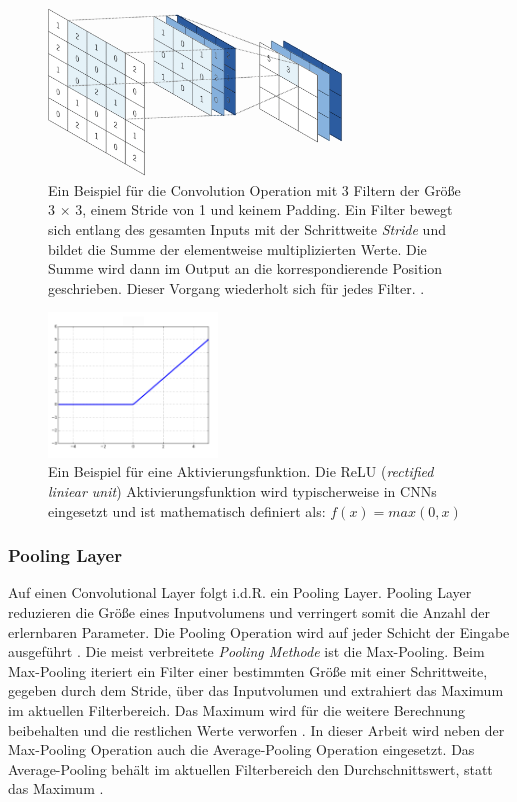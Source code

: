 \pagebreak
\vspace*{\fill}
\begin{figure}[H]
	\centering
	\includegraphics[width=0.7\textwidth]{images/convolution_layer.png}
	\caption{Ein Beispiel für die  Convolution Operation mit 3 Filtern der Größe 3 $\times$ 3, einem Stride von 1 und keinem Padding. Ein Filter bewegt sich entlang des gesamten Inputs mit der Schrittweite \textit{Stride} und bildet die Summe der elementweise multiplizierten Werte. Die Summe wird dann im Output an die korrespondierende Position geschrieben. Dieser Vorgang wiederholt sich für jedes Filter. \cite{yamashitaConvolutionalNeuralNetworks2018}. }
	\label{fig:convolution_layer}
\end{figure}

\begin{figure}[h]
	\centering
	\includegraphics[width=0.4\textwidth]{images/ReLU.png}
	\caption{Ein Beispiel für eine Aktivierungsfunktion. Die ReLU (\textit{rectified liniear unit}) Aktivierungsfunktion wird typischerweise in CNNs eingesetzt und ist mathematisch definiert als: $f(x) = max(0,x)$ \cite{Goodfellow-et-al-2016} }
	\label{fig:relu}
\end{figure}

\subsubsection{Pooling Layer}
Auf einen Convolutional Layer folgt i.d.R. ein Pooling Layer. Pooling Layer reduzieren die Größe eines Inputvolumens und verringert somit die Anzahl der erlernbaren Parameter. Die Pooling Operation wird auf jeder Schicht der Eingabe ausgeführt \cite{CS231nConvolutionalNeurala}. Die meist verbreitete \textit{Pooling Methode} ist die Max-Pooling. Beim Max-Pooling iteriert ein Filter einer bestimmten Größe mit einer Schrittweite, gegeben durch dem Stride, über das Inputvolumen und extrahiert das Maximum im aktuellen Filterbereich. Das Maximum wird für die weitere Berechnung beibehalten und die restlichen Werte verworfen
 \cite{CS231nConvolutionalNeurala}. In dieser Arbeit wird neben der Max-Pooling Operation auch die Average-Pooling Operation eingesetzt. Das Average-Pooling behält im aktuellen Filterbereich den Durchschnittswert, statt das Maximum \cite{CS231nConvolutionalNeurala}.
 
